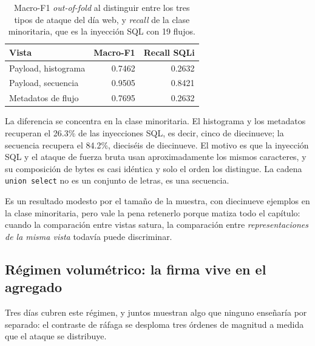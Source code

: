 \begin{table}[htbp]
  \centering
  \caption[Identificación del tipo de ataque web]{Macro-F1 \emph{out-of-fold} al
  distinguir entre los tres tipos de ataque del día web, y \emph{recall} de la
  clase minoritaria, que es la inyección SQL con 19 flujos.}
  \label{tab:multitipo}
  \begin{tabular}{lrr}
    \toprule
    \textbf{Vista} & \textbf{Macro-F1} & \textbf{Recall SQLi} \\
    \midrule
    Payload, histograma & 0.7462 & 0.2632 \\
    Payload, secuencia  & 0.9505 & 0.8421 \\
    Metadatos de flujo  & 0.7695 & 0.2632 \\
    \bottomrule
  \end{tabular}
\end{table}

La diferencia se concentra en la clase minoritaria. El histograma y los
metadatos recuperan el 26.3\% de las inyecciones SQL, es decir, cinco de
diecinueve; la secuencia recupera el 84.2\%, dieciséis de diecinueve. El motivo
es que la inyección SQL y el ataque de fuerza bruta usan aproximadamente los
mismos caracteres, y su composición de bytes es casi idéntica y solo
el orden los distingue. La cadena \texttt{union select} no es un conjunto de
letras, es una secuencia.

Es un resultado modesto por el tamaño de la muestra, con diecinueve ejemplos en
la clase minoritaria, pero vale la pena retenerlo porque matiza todo el capítulo:
cuando la comparación entre vistas satura, la comparación entre
\emph{representaciones de la misma vista} todavía puede discriminar.

\subsection{Régimen volumétrico: la firma vive en el agregado}
\label{sec:reg-volumetrico}

Tres días cubren este régimen, y juntos muestran algo que ninguno enseñaría por
separado: el contraste de ráfaga se desploma tres órdenes de magnitud a medida
que el ataque se distribuye.


